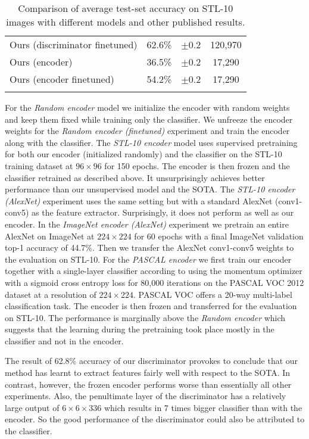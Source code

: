 \documentclass[a4paper,12pt]{report}
\begin{document}
\begin{table}[ht!]
\begin{tabular}{l c c|c}
Ours (discriminator finetuned) & 62.6\%  & $\pm$0.2 & 120,970 \\ %
Ours (encoder) & 36.5\%  & $\pm$0.2 & 17,290 \\ %
Ours (encoder finetuned) & 54.2\% & $\pm$0.2 & 17,290 \\ %
\Xhline{0.8pt}
\end{tabular}
\caption{Comparison of average test-set accuracy on STL-10 images with different models and other published results.} \label{tab:comparison_stl10}
\end{table}
For the \textit{Random encoder} model we initialize the encoder with random weights and keep them fixed while training only the classifier. We unfreeze the encoder weights for the \textit{Random encoder (finetuned)} experiment and train the encoder along with the classifier. The \textit{STL-10 encoder} model uses supervised pretraining for both our encoder (initialized randomly) and the classifier on the STL-10 training dataset at $96 \times 96$ for 150 epochs. The encoder is then frozen and the classifier retrained as described above. It unsurprisingly achieves better performance than our unsupervised model and the SOTA. The \textit{STL-10 encoder (AlexNet)} experiment uses the same setting but with a standard AlexNet (conv1-conv5) as the feature extractor. Surprisingly, it does not perform as well as our encoder. In the \textit{ImageNet encoder (AlexNet)} experiment we pretrain an entire AlexNet on ImageNet at $224 \times 224$ for 60 epochs with a final ImageNet validation top-1 accuracy of 44.7\%. Then we transfer the AlexNet conv1-conv5 weights to the evaluation on STL-10. For the \textit{PASCAL encoder} we first train our encoder together with a single-layer classifier according to \cite{PascalVocTraining} using the momentum optimizer with a sigmoid cross entropy loss for 80,000 iterations on the PASCAL VOC 2012 dataset at a resolution of $224 \times 224$. PASCAL VOC offers a 20-way multi-label classification task. The encoder is then frozen and transferred for the evaluation on STL-10. The performance is marginally above the \textit{Random encoder} which suggests that the learning during the pretraining took place mostly in the classifier and not in the encoder.

The result of 62.8\% accuracy of our discriminator provokes to conclude that our method has learnt to extract features fairly well with respect to the SOTA. In contrast, however, the frozen encoder performs worse than essentially all other experiments. Also, the penultimate layer of the discriminator has a relatively large output of $6 \times 6 \times 336$ which results in 7 times bigger classifier than with the encoder. So the good performance of the discriminator could also be attributed to the classifier.
\end{document}
